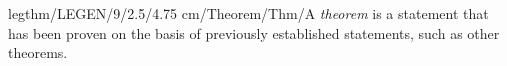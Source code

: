 legthm/LEGEN/9/2.5/4.75 cm/Theorem/Thm/{A \emph{theorem} is a statement that has been proven on the basis of previously established statements, such as other theorems.}